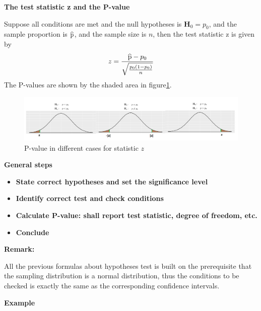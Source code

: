 \documentclass[a4paper, 12pt,twoside]{book}
\newcommand\reallywidehat[1]{%
\savestack{\tmpbox}{\stretchto{%
  \scaleto{%
    \scalerel*[\widthof{\ensuremath{#1}}]{\kern-.6pt\bigwedge\kern-.6pt}%
    {\rule[-\textheight/2]{1ex}{\textheight}}%
  }{\textheight}%
}{0.5ex}}%
\stackon[1pt]{#1}{\tmpbox}%
}
\begin{document}
\begin{itemize}
\item \textbf{The test statistic z and the P-value}\vspace{0.3cm}

Suppose all conditions are met and the null hypotheses is $\textbf{H}_0 = p_0$, and the sample proportion is $\reallywidehat{p}$, and the sample size is $n$, then the test statistic z is given by 
    $$z = \frac{\reallywidehat{p}-p_0}{\sqrt{\frac{p_0(1-p_0)}{n}}}$$
The P-values are shown by the shaded area in figure\ref{TestStatisticAndPvalue}.
\begin{figure}[H]
\centering
\includegraphics[scale=0.4]{TestStatisticAndPvalue}
\caption{P-value in different cases for statistic $z$}
\label{TestStatisticAndPvalue}
\end{figure}


 \item \textbf{General steps}\vspace{0.3cm}

\begin{itemize}
  \item \textbf{State correct hypotheses and set the significance level}
  \item \textbf{Identify correct test and check conditions}
  \item \textbf{Calculate P-value: shall report test statistic, degree of freedom, etc.}
  \item \textbf{Conclude}
\end{itemize}

\colorbox{babypink}{\parbox{0.9\textwidth}{
\textbf{Remark:}\vspace{0.3cm}

All the previous formulas about hypotheses test is built on the prerequisite that the sampling distribution is a normal distribution, thus the conditions to be checked is exactly the same as the corresponding confidence intervals.
}}
\newpage



\colorbox{champagne}{\parbox{0.9\textwidth}{
\item \textbf{Example}\vspace{0.3cm}

}}
\end{itemize}
\end{document}

